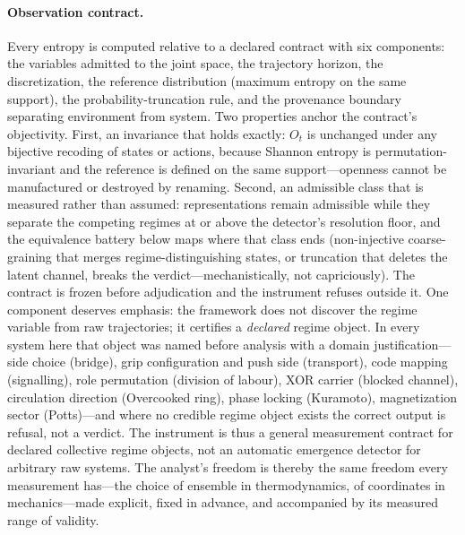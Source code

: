\documentclass[11pt]{article}
\begin{document}
\paragraph{Observation contract.}
Every entropy is computed relative to a declared contract with six
components: the variables admitted to the joint space, the trajectory
horizon, the discretization, the reference distribution (maximum
entropy on the same support), the probability-truncation rule, and the
provenance boundary separating environment from system. Two properties
anchor the contract's objectivity. First, an invariance that holds
exactly: $O_t$ is unchanged under any bijective recoding of states or
actions, because Shannon entropy is permutation-invariant and the
reference is defined on the same support---openness cannot be
manufactured or destroyed by renaming. Second, an admissible class
that is measured rather than assumed: representations remain
admissible while they separate the competing regimes at or above the
detector's resolution floor, and the equivalence battery below maps
where that class ends (non-injective coarse-graining that merges
regime-distinguishing states, or truncation that deletes the latent
channel, breaks the verdict---mechanistically, not capriciously). The
contract is frozen before adjudication and the instrument refuses
outside it. One component deserves emphasis: the framework does not
discover the regime variable from raw trajectories; it certifies a
\emph{declared} regime object. In every system here that object was
named before analysis with a domain justification---side choice
(bridge), grip configuration and push side (transport), code mapping
(signalling), role permutation (division of labour), XOR carrier
(blocked channel), circulation direction (Overcooked ring), phase
locking (Kuramoto), magnetization sector (Potts)---and where no
credible regime object exists the correct output is refusal, not a
verdict. The instrument is thus a general measurement contract for
declared collective regime objects, not an automatic emergence
detector for arbitrary raw systems. The analyst's freedom is thereby
the same freedom every measurement has---the choice of ensemble in
thermodynamics, of coordinates in mechanics---made explicit, fixed in
advance, and accompanied by its measured range of validity.
\end{document}
